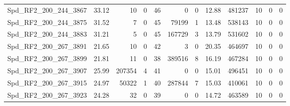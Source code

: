 \begin{longtable}[c]{@{}lrrrrrrrrrrr@{}}
Spd\_RF2\_200\_244\_3867      & 33.12                  & 10                      & 0                       & 46                     & 0                       & 0                       & 12.88                   & 481237                   & 10                       & 0                        & 0                        \\
Spd\_RF2\_200\_244\_3875      & 31.52                  & 7                       & 0                       & 45                     & 79199                   & 1                       & 13.48                   & 538143                   & 10                       & 0                        & 0                        \\
Spd\_RF2\_200\_244\_3883      & 31.21                  & 5                       & 0                       & 45                     & 167729                  & 3                       & 13.79                   & 531602                   & 10                       & 0                        & 0                        \\
Spd\_RF2\_200\_267\_3891      & 21.65                  & 10                      & 0                       & 42                     & 3                       & 0                       & 20.35                   & 464697                   & 10                       & 0                        & 0                        \\
Spd\_RF2\_200\_267\_3899      & 21.81                  & 11                      & 0                       & 38                     & 389516                  & 8                       & 16.19                   & 467284                   & 10                       & 0                        & 0                        \\
Spd\_RF2\_200\_267\_3907      & 25.99                  & 207354                  & 4                       & 41                     & 0                       & 0                       & 15.01                   & 496451                   & 10                       & 0                        & 0                        \\
Spd\_RF2\_200\_267\_3915      & 24.97                  & 50322                   & 1                       & 40                     & 287844                  & 7                       & 15.03                   & 410061                   & 10                       & 0                        & 0                        \\
Spd\_RF2\_200\_267\_3923      & 24.28                  & 32                      & 0                       & 39                     & 0                       & 0                       & 14.72                   & 463589                   & 10                       & 0                        & 0                        \\

\end{longtable}
